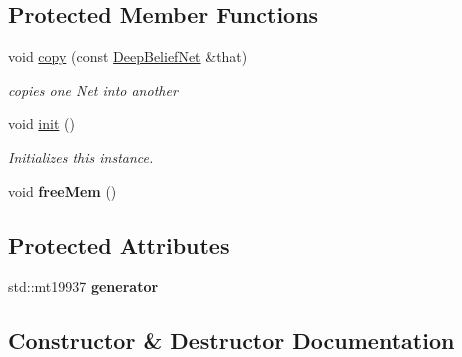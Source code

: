\subsection*{Protected Member Functions}
\begin{DoxyCompactItemize}
\item 
void \hyperlink{class_n_n_t_lib_1_1_deep_belief_net_a19366c4ffaa837f4b4e2a73370d0e7b1}{copy} (const \hyperlink{class_n_n_t_lib_1_1_deep_belief_net}{Deep\+Belief\+Net} \&that)
\begin{DoxyCompactList}\small\item\em copies one Net into another \end{DoxyCompactList}\item 
void \hyperlink{class_n_n_t_lib_1_1_deep_belief_net_ad56044ef26b9980d3d577f9c71ba209e}{init} ()
\begin{DoxyCompactList}\small\item\em Initializes this instance. \end{DoxyCompactList}\item 
\hypertarget{class_n_n_t_lib_1_1_deep_belief_net_affb155c266325f3b7047cbc735bfd133}{}void {\bfseries free\+Mem} ()\label{class_n_n_t_lib_1_1_deep_belief_net_affb155c266325f3b7047cbc735bfd133}

\end{DoxyCompactItemize}
\subsection*{Protected Attributes}
\begin{DoxyCompactItemize}
\item 
\hypertarget{class_n_n_t_lib_1_1_deep_belief_net_ae6411b17e087b77332fe27b5d2a81458}{}std\+::mt19937 {\bfseries generator}\label{class_n_n_t_lib_1_1_deep_belief_net_ae6411b17e087b77332fe27b5d2a81458}

\end{DoxyCompactItemize}


\subsection{Constructor \& Destructor Documentation}
\hypertarget{class_n_n_t_lib_1_1_deep_belief_net_acaac4b567554fcbcfb2690d9cb2e1efb}{}
